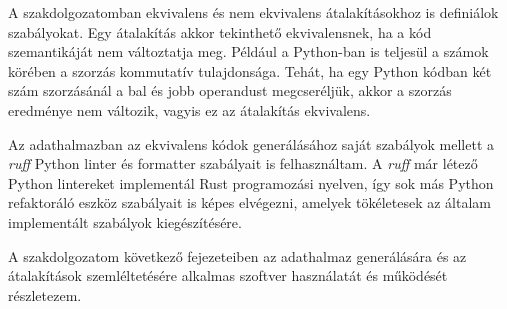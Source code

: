 A szakdolgozatomban ekvivalens és nem ekvivalens átalakításokhoz is definiálok szabályokat.
Egy átalakítás akkor tekinthető ekvivalensnek, ha a kód szemantikáját nem változtatja meg.
Például a Python-ban is teljesül a számok körében a szorzás kommutatív tulajdonsága.
Tehát, ha egy Python kódban két szám szorzásánál a bal és jobb operandust megcseréljük,
akkor a szorzás eredménye nem változik, vagyis ez az átalakítás ekvivalens.

Az adathalmazban az ekvivalens kódok generálásához saját szabályok mellett
a \emph{ruff} Python linter és formatter
\cite{Ruff} szabályait is felhasználtam.
A \emph{ruff} már létező Python lintereket implementál Rust programozási nyelven,
így sok más Python refaktoráló eszköz szabályait is képes elvégezni,
amelyek tökéletesek az általam implementált szabályok kiegészítésére.

A szakdolgozatom következő fejezeteiben az adathalmaz generálására és az átalakítások
szemléltetésére alkalmas szoftver használatát és működését részletezem.
